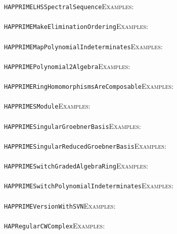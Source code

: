 \documentclass[a4paper,11pt]{report}
\begin{document}
{{ \texttt{HAPPRIME{\textunderscore}LHSSpectralSequence}{\nobreakspace}{\nobreakspace}{\nobreakspace}{\nobreakspace}\textsc{Examples:} \\
 \\
 \texttt{HAPPRIME{\textunderscore}MakeEliminationOrdering}{\nobreakspace}{\nobreakspace}{\nobreakspace}{\nobreakspace}\textsc{Examples:} \\
 \\
 \texttt{HAPPRIME{\textunderscore}MapPolynomialIndeterminates}{\nobreakspace}{\nobreakspace}{\nobreakspace}{\nobreakspace}\textsc{Examples:} \\
 \\
 \texttt{HAPPRIME{\textunderscore}Polynomial2Algebra}{\nobreakspace}{\nobreakspace}{\nobreakspace}{\nobreakspace}\textsc{Examples:} \\
 \\
 \texttt{HAPPRIME{\textunderscore}RingHomomorphismsAreComposable}{\nobreakspace}{\nobreakspace}{\nobreakspace}{\nobreakspace}\textsc{Examples:} \\
 \\
 \texttt{HAPPRIME{\textunderscore}SModule}{\nobreakspace}{\nobreakspace}{\nobreakspace}{\nobreakspace}\textsc{Examples:} \\
 \\
 \texttt{HAPPRIME{\textunderscore}SingularGroebnerBasis}{\nobreakspace}{\nobreakspace}{\nobreakspace}{\nobreakspace}\textsc{Examples:} \\
 \\
 \texttt{HAPPRIME{\textunderscore}SingularReducedGroebnerBasis}{\nobreakspace}{\nobreakspace}{\nobreakspace}{\nobreakspace}\textsc{Examples:} \\
 \\
 \texttt{HAPPRIME{\textunderscore}SwitchGradedAlgebraRing}{\nobreakspace}{\nobreakspace}{\nobreakspace}{\nobreakspace}\textsc{Examples:} \\
 \\
 \texttt{HAPPRIME{\textunderscore}SwitchPolynomialIndeterminates}{\nobreakspace}{\nobreakspace}{\nobreakspace}{\nobreakspace}\textsc{Examples:} \\
 \\
 \texttt{HAPPRIME{\textunderscore}VersionWithSVN}{\nobreakspace}{\nobreakspace}{\nobreakspace}{\nobreakspace}\textsc{Examples:} \\
 \\
 \texttt{HAPRegularCWComplex}{\nobreakspace}{\nobreakspace}{\nobreakspace}{\nobreakspace}\textsc{Examples:} \\
}}
\end{document}
